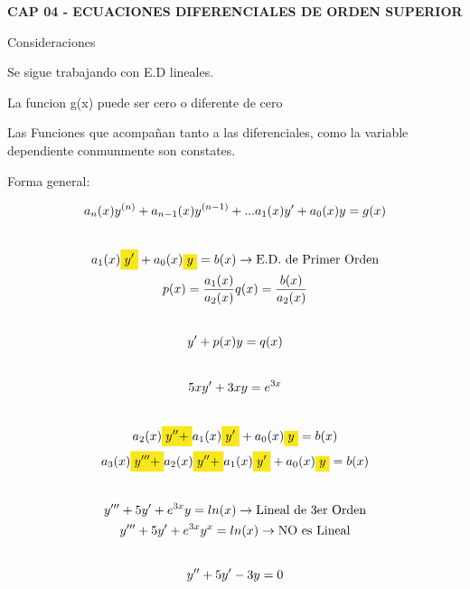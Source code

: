 \documentclass{article}
\begin{document}
\textbf{CAP 04 - ECUACIONES DIFERENCIALES DE ORDEN SUPERIOR}



Consideraciones

Se sigue trabajando con E.D lineales.

La funcion g(x) puede ser cero o diferente de cero

Las Funciones que acompañan tanto a las diferenciales, como la variable dependiente conmunmente son constates.



Forma general:




\begin{gather*}
a_{n}(x)y^{(n)}+a_{n-1}(x)y^{(n-1)}+...a_{1}(x)y'+a_{0}(x)y = g(x) \\
\vspace{0.5em} \\
a_{1}(x)\text{\colorbox[RGB]{248,231,28}{$y'$}}+ a_{0}(x)\text{\colorbox[RGB]{248,231,28}{$y$}} = b(x)  \rightarrow \text{E.D. de Primer Orden} \\
p(x) = \frac{a_{1}(x)}{a_{2}(x)}    q(x) = \frac{b(x)}{a_{2}(x)} \\
\vspace{0.5em} \\
y' + p(x)y = q(x) \\
\vspace{0.5em} \\
5xy' + 3xy  = e^{3x} \\
\vspace{0.5em} \\
a_{2}(x)\text{\colorbox[RGB]{248,231,28}{$y''+$}}a_{1}(x)\text{\colorbox[RGB]{248,231,28}{$y'$}}+ a_{0}(x)\text{\colorbox[RGB]{248,231,28}{$y$}} = b(x) \\
a_{3}(x)\text{\colorbox[RGB]{248,231,28}{$y'''+$}}a_{2}(x)\text{\colorbox[RGB]{248,231,28}{$y''+$}}a_{1}(x)\text{\colorbox[RGB]{248,231,28}{$y'$}}+ a_{0}(x)\text{\colorbox[RGB]{248,231,28}{$y$}} = b(x) \\
\vspace{0.5em} \\
y'''+5y'+e^{3x}y = ln(x)  \rightarrow \text{Lineal de 3er Orden} \\
y'''+5y'+e^{3x}y^{x} = ln(x)  \rightarrow \text{NO es Lineal} \\
\vspace{0.5em} \\
y''+5y'-3y = 0
\end{gather*}
\end{document}
